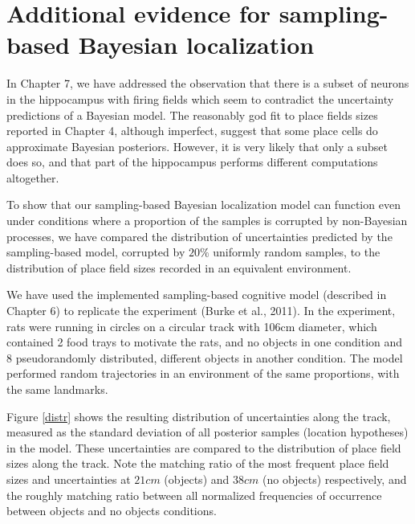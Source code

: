 
\chapter{Additional evidence for sampling-based Bayesian localization}
\label{apx:pfev}

In Chapter 7, we have addressed the observation that there is a subset of neurons in the hippocampus with firing fields which seem to contradict the uncertainty predictions of a Bayesian model. The reasonably god fit to place fields sizes reported in Chapter 4, although imperfect, suggest that some place cells do approximate Bayesian posteriors. However, it is very likely that only a subset does so, and that part of the hippocampus performs different computations altogether.

To show that our sampling-based Bayesian localization model can function even under conditions where a proportion of the samples is corrupted by non-Bayesian processes, we have compared the distribution of uncertainties predicted by the sampling-based model, corrupted by $20 \%$ uniformly random samples, to the distribution of place field sizes recorded in an equivalent environment. 

We have used the implemented sampling-based cognitive model (described in Chapter 6) to replicate the experiment (Burke et al., 2011). In the experiment, rats were running in circles on a circular track with 106cm diameter, which contained 2 food trays to motivate the rats, and no objects in one condition and 8 pseudorandomly distributed, different objects in another condition. The model performed random trajectories in an environment of the same proportions, with the same landmarks. 

Figure \ref{distr} shows the resulting distribution of uncertainties along the track, measured as the standard deviation of all posterior samples (location hypotheses) in the model. These uncertainties are compared to the distribution of place field sizes along the track. Note the matching ratio of the most frequent place field sizes and uncertainties at $21cm$ (objects) and $38cm$ (no objects) respectively, and the roughly matching ratio between all normalized frequencies of occurrence between objects and no objects conditions.

